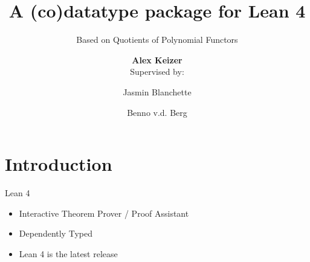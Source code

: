 \documentclass[t,12pt]{beamer}
\title[]{A (co)datatype package for Lean 4}
\subtitle{Based on Quotients of Polynomial Functors}
\date{}
\author{\textbf{Alex Keizer} \\ Supervised by: \and Jasmin Blanchette \and Benno v.d. Berg}
\begin{document}
\nonstopmode %



\section*{Introduction}

 {
  \begin{frame}[plain]
      \maketitle
  \end{frame}
  \addtocounter{framenumber}{-1}%
 }

 {
  \begin{frame}{Lean 4}
      \begin{itemize}
          \item Interactive Theorem Prover / Proof Assistant
          \item Dependently Typed
          \item Lean 4 is the latest release
      \end{itemize}

      \bigskip

  \end{frame}
 }




\end{document}
